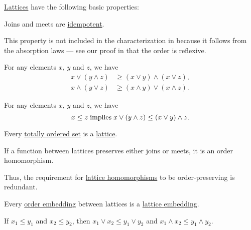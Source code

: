 \begin{proposition}\label{thm:def:lattice}
  \hyperref[def:lattice]{Lattices} have the following basic properties:
  \begin{thmenum}
     Joins and meets are \hyperref[def:binary_operation/idempotent]{idempotent}.

    This property is not included in the characterization in  because it follows from the absorption laws --- see our proof in  that the order is reflexive.

     For any elements \( x \), \( y \) and \( z \), we have
    \begin{align}
      x \vee (y \wedge z) &\geq (x \vee y) \wedge (x \vee z), \label{eq:thm:def:lattice/distributive_inequality/join_over_meet} \\
      x \wedge (y \vee z) &\geq (x \wedge y) \vee (x \wedge z). \label{eq:thm:def:lattice/distributive_inequality/meet_over_join}
    \end{align}

     For any elements \( x \), \( y \) and \( z \), we have
    \begin{equation}\label{eq:thm:def:lattice/modular_inequality}
      x \leq z \T{implies} x \vee (y \wedge z) \leq (x \vee y) \wedge z.
    \end{equation}

     Every \hyperref[def:totally_ordered_set]{totally ordered set} is a \hyperref[def:lattice]{lattice}.

     If a function between lattices preserves either joins or meets, it is an order homomorphism.

    Thus, the requirement for \hyperref[def:lattice/homomorphism]{lattice homomorphisms} to be order-preserving is redundant.

     Every \hyperref[def:preordered_set/homomorphism]{order embedding} between lattices is a \hyperref[def:lattice/homomorphism]{lattice embedding}.

     If \( x_1 \leq y_1 \) and \( x_2 \leq y_2 \), then \( x_1 \vee x_2 \leq y_1 \vee y_2 \) and \( x_1 \wedge x_2 \leq y_1 \wedge y_2 \).
  \end{thmenum}
\end{proposition}
